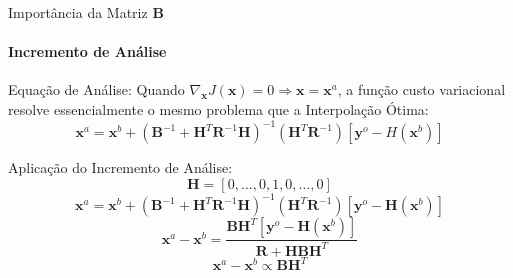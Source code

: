 \documentclass[10pt,aspectratio=169]{beamer}
\begin{document}
\begin{frame}[fragile]{Importância da Matriz $\mathbf{B}$}
\framesubtitle{Incremento de Análise}
  \begin{block}{Equação de Análise:}
  \vspace{0.5em}
    Quando $\nabla_{\mathbf{x}}{J(\mathbf{x})} = 0 \Rightarrow \mathbf{x} = \mathbf{x}^{a}$, a função custo variacional resolve essencialmente o mesmo problema que a Interpolação Ótima:
    \begin{equation*}
      \mathbf{x}^{a} = \mathbf{x}^{b} + (\mathbf{B}^{-1} + \mathbf{H}^{T}\mathbf{R}^{-1}\mathbf{H})^{-1}(\mathbf{H}^{T}\mathbf{R}^{-1})[\mathbf{y}^{o} - H(\mathbf{x}^{b})]
    \end{equation*}
  \end{block}
  \pause
    \begin{block}{Aplicação do Incremento de Análise:}  
    \vspace{-0.5em}
    \begin{equation*}
      \mathbf{H}=[0,\dots,0,1,0,\dots,0] 
    \end{equation*}
    \begin{equation*}
      \mathbf{x}^{a} = \mathbf{x}^{b} + (\mathbf{B}^{-1} + \mathbf{H}^{T}\mathbf{R}^{-1}\mathbf{H})^{-1}(\mathbf{H}^{T}\mathbf{R}^{-1})[\mathbf{y}^{o} - \mathbf{H}(\mathbf{x}^{b})] 
    \end{equation*}
    \begin{equation*}
      \mathbf{x}^{a} - \mathbf{x}^{b} = \frac{\mathbf{B}\mathbf{H}^{T}[\mathbf{y}^{o} - \mathbf{H}(\mathbf{x}^{b})]}{\mathbf{R} + \mathbf{H}\mathbf{B}\mathbf{H}^{T}} 
    \end{equation*}
    \begin{equation*}
      \mathbf{x}^{a}-\mathbf{x}^{b} \propto \mathbf{BH}^{T}
    \end{equation*}
  \end{block}
\end{frame}
\end{document}

